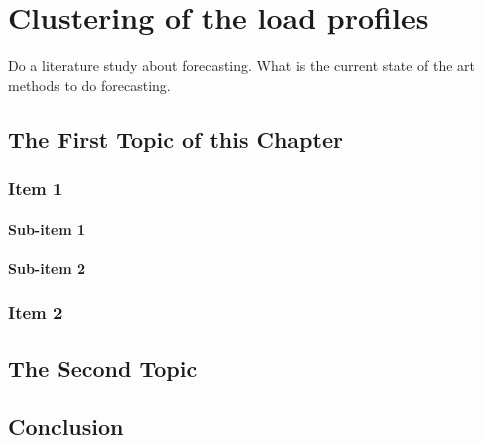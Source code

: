 \chapter{Clustering of the load profiles}
\label{cha:n}
Do a literature study about forecasting. What is the current state of the art methods to do forecasting. 

\section{The First Topic of this Chapter}
\subsection{Item 1}
\subsubsection{Sub-item 1}
\lipsum[80]

\subsubsection{Sub-item 2}
\lipsum[81]

\subsection{Item 2}
\lipsum[82]

\section{The Second Topic}
\lipsum[83-85]

\section{Conclusion}
\lipsum[86-88]

